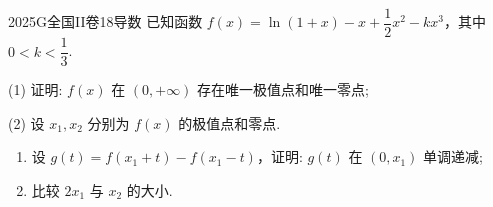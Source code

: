 
\begin{problem}{2025}{G}{全国II卷}{18}{导数}
已知函数 $f(x)=\ln(1+x)-x+\dfrac{1}{2}x^2-kx^3$，其中 $0 < k < \dfrac{1}{3}$.

(1) 证明: $f(x)$ 在 $(0,+\infty)$ 存在唯一极值点和唯一零点;

(2) 设 $x_1, x_2$ 分别为 $f(x)$ 的极值点和零点.
\begin{enumerate}
\item 设 $g(t)=f(x_1+t)-f(x_1-t)$，证明: $g(t)$ 在 $(0, x_1)$ 单调递减;
\item 比较 $2x_1$ 与 $x_2$ 的大小.
\end{enumerate}
\end{problem}